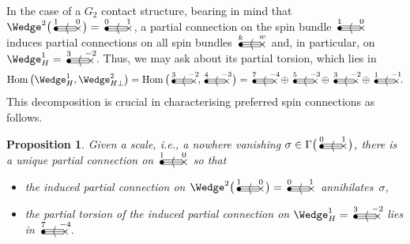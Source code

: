 \documentclass[pdftex]{sigma}%
\numberwithin{equation}{section}
\newtheorem{prop}[Theorem]{Proposition}
 { \theoremstyle{definition}
\newtheorem{Definition}[Theorem]{Definition}
\newtheorem{Note}[Theorem]{Note}
\newtheorem{Example}[Theorem]{Example}
\newtheorem{Remark}[Theorem]{Remark} }
\newcommand{\Hom}{\operatorname{Hom}}
\newcommand{\gtwo}[2]{\begin{picture}(28,10)
\put(4,1.1){\makebox(0,0){$\bullet$}}
\put(24,1.5){\makebox(0,0){$\times$}}
\put(4,3.5){\line(1,0){18}}
\put(4,1.5){\line(1,0){20}}
\put(4,-.5){\line(1,0){18}}
\put(14,1.5){\makebox(0,0){$\langle$}}
\put(4,8){\makebox(0,0){$\scriptstyle #1$}}
\put(24,8){\makebox(0,0){$\scriptstyle #2$}}
\end{picture}}
\begin{document}
In the case of a $G_2$ contact structure, bearing in mind that
$\Wedge^2\big(\gtwo{1}{0}\big)=\gtwo{0}{1}$, a partial connection on the spin bundle
$\gtwo{1}{0}$ induces partial connections on all spin bundles $\gtwo{k}{w}$
and, in particular, on $\Wedge_H^1=\gtwo{3}{-2}$. Thus, we may ask about
its partial torsion, which lies in
\begin{equation}\label{partial_torsion_decomposition}
\Hom\big({\Wedge}_H^1,\Wedge_{H\perp}^2\big)=\Hom\big(\gtwo{3}{-2},\gtwo{4}{-3}\,\big)
=\gtwo{7}{-4}\oplus\gtwo{5}{-3}\oplus\gtwo{3}{-2}\oplus\gtwo{1}{-1}.
\end{equation}
This decomposition is crucial in characterising preferred spin connections as
follows.
\begin{prop}\label{three}
Given a scale, i.e., a nowhere vanishing $\sigma\in\Gamma\big(\gtwo{0}{1}\big)$, there
is a unique partial connection on $\gtwo{1}{0}$ so that
\begin{itemize}\itemsep=0pt
\item the induced partial connection on $\Wedge^2\big(\gtwo{1}{0}\big)=\gtwo{0}{1}$
annihilates~$\sigma$,
\item the partial torsion of the induced partial connection on $\Wedge_H^1=\gtwo{3}{-2}$ lies in $\gtwo{7}{-4}$.
\end{itemize}
\end{prop}
\end{document}
